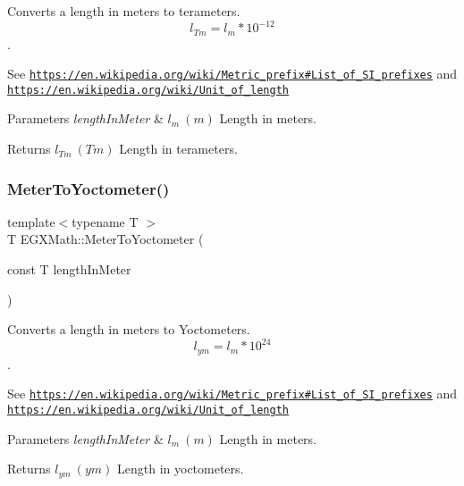 Converts a length in meters to terameters. \[ l_{Tm}=l_{m} * 10^{-12} \]. 

See \href{https://en.wikipedia.org/wiki/Metric_prefix#List_of_SI_prefixes}{\tt https\+://en.\+wikipedia.\+org/wiki/\+Metric\+\_\+prefix\#\+List\+\_\+of\+\_\+\+S\+I\+\_\+prefixes} and \href{https://en.wikipedia.org/wiki/Unit_of_length}{\tt https\+://en.\+wikipedia.\+org/wiki/\+Unit\+\_\+of\+\_\+length} 
\begin{DoxyParams}{Parameters}
{\em length\+In\+Meter} & $ l_{m}\ (m)$ Length in meters. \\
\hline
\end{DoxyParams}
\begin{DoxyReturn}{Returns}
$ l_{Tm}\ (Tm)$ Length in terameters. 
\end{DoxyReturn}
\mbox{\label{group___e_g_x_math-_conversions-_length_conversions-_meter-_s_i_ga0a9af3add4234d53c0ea30906ead1c3a}} 
\subsubsection{\texorpdfstring{Meter\+To\+Yoctometer()}{MeterToYoctometer()}}
{\footnotesize\ttfamily template$<$typename T $>$ \\
T E\+G\+X\+Math\+::\+Meter\+To\+Yoctometer (\begin{DoxyParamCaption}\item[{const T}]{length\+In\+Meter }\end{DoxyParamCaption})}



Converts a length in meters to Yoctometers. \[ l_{ym}=l_{m} * 10^{24} \]. 

See \href{https://en.wikipedia.org/wiki/Metric_prefix#List_of_SI_prefixes}{\tt https\+://en.\+wikipedia.\+org/wiki/\+Metric\+\_\+prefix\#\+List\+\_\+of\+\_\+\+S\+I\+\_\+prefixes} and \href{https://en.wikipedia.org/wiki/Unit_of_length}{\tt https\+://en.\+wikipedia.\+org/wiki/\+Unit\+\_\+of\+\_\+length} 
\begin{DoxyParams}{Parameters}
{\em length\+In\+Meter} & $ l_{m}\ (m)$ Length in meters. \\
\hline
\end{DoxyParams}
\begin{DoxyReturn}{Returns}
$ l_{ym}\ (ym)$ Length in yoctometers. 
\end{DoxyReturn}
\mbox{\label{group___e_g_x_math-_conversions-_length_conversions-_meter-_s_i_ga53fdb093b4572363a0ae9be4ced2ecb4}} 
